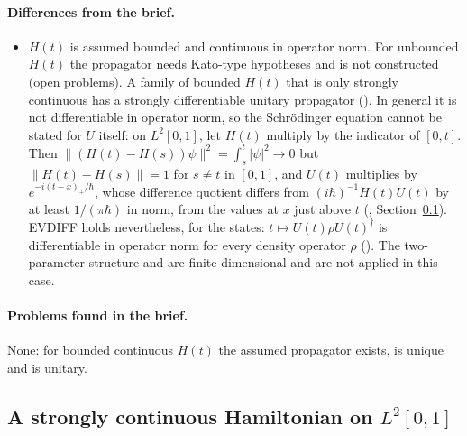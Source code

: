 \documentclass[11pt]{article}
\begin{document}
\paragraph{Differences from the brief.}
\begin{itemize}
\item $H(t)$ is assumed bounded and continuous in operator norm. For unbounded $H(t)$ the
  propagator needs Kato-type hypotheses and is not constructed (open problems). A family of
  bounded $H(t)$ that is only strongly continuous has a strongly differentiable unitary
  propagator (). In general it is not differentiable
  in operator norm, so the Schr\"odinger equation cannot be stated for $U$ itself: on
  $L^2[0,1]$, let $H(t)$ multiply by the indicator of $[0,t]$. Then
  $\|(H(t) - H(s))\psi\|^2 = \int_s^t|\psi|^2 \to 0$ but $\|H(t) - H(s)\| = 1$ for $s \ne t$ in
  $[0,1]$, and $U(t)$ multiplies by $e^{-i(t - x)_+/\hbar}$, whose difference quotient differs
  from $(i\hbar)^{-1}H(t)U(t)$ by at least $1/(\pi\hbar)$ in norm, from the values at $x$ just
  above $t$ (,
  Section~\ref{sec:unitary-entropy-indicator}).
  EVDIFF holds nevertheless, for the states: $t \mapsto U(t)\rho U(t)^\dagger$ is differentiable in
  operator norm for every density operator $\rho$ ().
  The two-parameter structure  and  are
  finite-dimensional and are not applied in this case.
\end{itemize}

\paragraph{Problems found in the brief.} None: for bounded continuous $H(t)$ the assumed
propagator exists, is unique and is unitary.

\subsection{A strongly continuous Hamiltonian on \texorpdfstring{$L^2[0,1]$}{L2[0,1]}}%
\label{sec:unitary-entropy-indicator}
\end{document}
